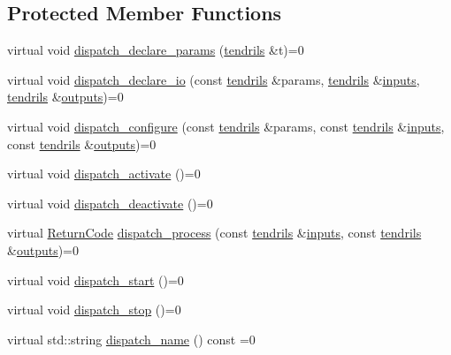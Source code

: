\subsection*{Protected Member Functions}
\begin{DoxyCompactItemize}
\item 
virtual void \hyperlink{structecto_1_1cell_abcf3cc29703214a7ede63d652e17ee96}{dispatch\-\_\-declare\-\_\-params} (\hyperlink{classecto_1_1tendrils}{tendrils} \&t)=0
\item 
virtual void \hyperlink{structecto_1_1cell_acb4cdb70f2db329ba9c615d74c63a4b2}{dispatch\-\_\-declare\-\_\-io} (const \hyperlink{classecto_1_1tendrils}{tendrils} \&params, \hyperlink{classecto_1_1tendrils}{tendrils} \&\hyperlink{structecto_1_1cell_a65099b0458a7761b8bfa7a1ddc17e92f}{inputs}, \hyperlink{classecto_1_1tendrils}{tendrils} \&\hyperlink{structecto_1_1cell_a93951743b603faba35312ebdb07ceb22}{outputs})=0
\item 
virtual void \hyperlink{structecto_1_1cell_a19c7c679dededd37ace918bf0ff31cd3}{dispatch\-\_\-configure} (const \hyperlink{classecto_1_1tendrils}{tendrils} \&params, const \hyperlink{classecto_1_1tendrils}{tendrils} \&\hyperlink{structecto_1_1cell_a65099b0458a7761b8bfa7a1ddc17e92f}{inputs}, const \hyperlink{classecto_1_1tendrils}{tendrils} \&\hyperlink{structecto_1_1cell_a93951743b603faba35312ebdb07ceb22}{outputs})=0
\item 
virtual void \hyperlink{structecto_1_1cell_aa345ec700e5e213364c7bb20571cd78d}{dispatch\-\_\-activate} ()=0
\item 
virtual void \hyperlink{structecto_1_1cell_a4b5f111fc7b90dccce0cd70e28c9be62}{dispatch\-\_\-deactivate} ()=0
\item 
virtual \hyperlink{namespaceecto_a93d82cd28db695d53963fb696582762c}{Return\-Code} \hyperlink{structecto_1_1cell_a390bd83cfdff120523efc5c3e76bc3e5}{dispatch\-\_\-process} (const \hyperlink{classecto_1_1tendrils}{tendrils} \&\hyperlink{structecto_1_1cell_a65099b0458a7761b8bfa7a1ddc17e92f}{inputs}, const \hyperlink{classecto_1_1tendrils}{tendrils} \&\hyperlink{structecto_1_1cell_a93951743b603faba35312ebdb07ceb22}{outputs})=0
\item 
virtual void \hyperlink{structecto_1_1cell_ab5c75358dd32fa811116654bdc76385b}{dispatch\-\_\-start} ()=0
\item 
virtual void \hyperlink{structecto_1_1cell_a65ff7141e927a7115a785478a03b94bc}{dispatch\-\_\-stop} ()=0
\item 
virtual std\-::string \hyperlink{structecto_1_1cell_a456b56e3291f5e2bb68ce31a4a43ece5}{dispatch\-\_\-name} () const =0

\end{DoxyCompactItemize}
